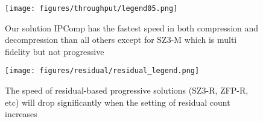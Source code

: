 






\begin{figure}[ht] \centering
\hspace{1.2mm}
\texttt{[image: figures/throughput/legend05.png]}

\hspace{-8mm}
\caption{Our solution IPComp has the fastest speed in both compression and decompression than all others except for SZ3-M which is multi fidelity but not progressive}
\label{fig:throughput}
\end{figure}

\begin{figure}[ht] \centering
\vspace{3mm}
\hspace{6mm}
\texttt{[image: figures/residual/residual\_legend.png]}
\caption{The speed of residual-based progressive solutions (SZ3-R, ZFP-R, etc) will drop significantly when the setting of residual count increases}
\label{fig:residual}

\end{figure}


